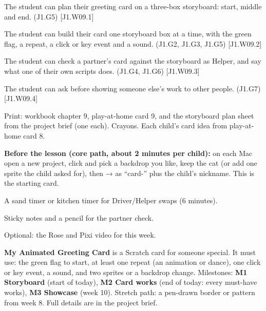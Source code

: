 
\begin{objectives}
  \item The student can plan their greeting card on a three-box storyboard: start, middle and end. (J1.G5) [J1.W09.1]
  \item The student can build their card one storyboard box at a time, with the green flag, a repeat, a click or key event and a sound. (J1.G2, J1.G3, J1.G5) [J1.W09.2]
  \item The student can check a partner's card against the storyboard as Helper, and say what one of their own scripts does. (J1.G4, J1.G6) [J1.W09.3]
  \item The student can ask before showing someone else's work to other people. (J1.G7) [J1.W09.4]
\end{objectives}

\begin{materials}
  \item Print: workbook chapter 9, play-at-home card 9, and the storyboard plan sheet from the project brief (one each). Crayons. Each child's card idea from play-at-home card 8.
  \item \textbf{Before the lesson (core path, about 2 minutes per child):} on each Mac open a new project, click  and pick a backdrop you like, keep the cat (or add one sprite the child asked for), then  →  as \enquote{card-} plus the child's nickname. This is the starting card.
  \item A sand timer or kitchen timer for Driver/Helper swaps (6 minutes).
  \item Sticky notes and a pencil for the partner check.
  \item Optional: the Rose and Pixi video for this week.
\end{materials}

\begin{teachernote}
\textbf{My Animated Greeting Card} is a Scratch card for someone special. It must use: the green flag to start, at least one repeat (an animation or dance), one click or key event, a sound, and two sprites or a backdrop change. Milestones: \textbf{M1 Storyboard} (start of today), \textbf{M2 Card works} (end of today: every must-have works), \textbf{M3 Showcase} (week 10). Stretch path: a pen-drawn border or pattern from week 8. Full details are in the project brief.
\end{teachernote}

